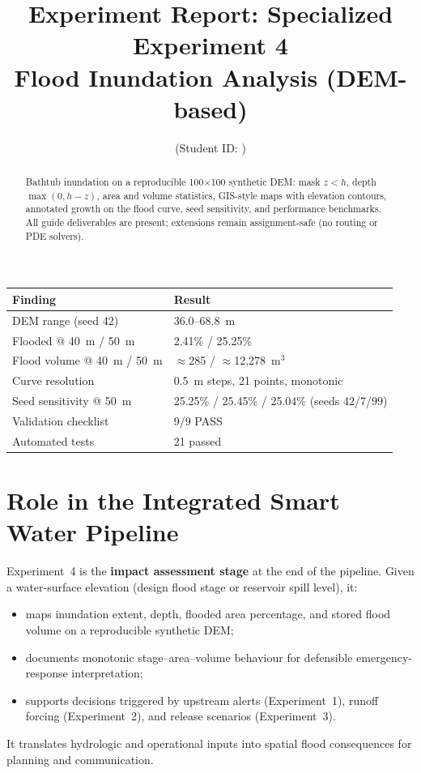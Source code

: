 \documentclass[11pt,a4paper]{article}
\title{Experiment Report: Specialized Experiment 4\\Flood Inundation Analysis (DEM-based)}
\author{\studentname \quad (Student ID: \studentid)}
\date{\reportdate}
\begin{document}
\maketitle

\begin{abstract}
Bathtub inundation on a reproducible 100$\times$100 synthetic DEM: mask $z<h$, depth $\max(0,h-z)$, area and volume statistics, GIS-style maps with elevation contours, annotated growth on the flood curve, seed sensitivity, and performance benchmarks. All guide deliverables are present; extensions remain assignment-safe (no routing or PDE solvers).
\end{abstract}

\begin{tcolorbox}[
  colback=blue!4,
  colframe=blue!55!black,
  title=\textbf{Key Findings (Executive Summary)},
  fonttitle=\bfseries,
  arc=2mm,
]
\begin{tabular}{@{}ll@{}}
\textbf{Finding} & \textbf{Result} \\
\hline
DEM range (seed 42) & 36.0--68.8~m \\
Flooded @ 40~m / 50~m & 2.41\% / 25.25\% \\
Flood volume @ 40~m / 50~m & $\approx$285 / $\approx$12{,}278~m$^3$ \\
Curve resolution & 0.5~m steps, 21 points, monotonic \\
Seed sensitivity @ 50~m & 25.25\% / 25.45\% / 25.04\% (seeds 42/7/99) \\
Validation checklist & 9/9 PASS \\
Automated tests & 21 passed \\
\end{tabular}
\end{tcolorbox}

\section{Role in the Integrated Smart Water Pipeline}
Experiment~4 is the \textbf{impact assessment stage} at the end of the pipeline. Given a water-surface elevation (design flood stage or reservoir spill level), it:
\begin{itemize}[noitemsep]
  \item maps inundation extent, depth, flooded area percentage, and stored flood volume on a reproducible synthetic DEM;
  \item documents monotonic stage--area--volume behaviour for defensible emergency-response interpretation;
  \item supports decisions triggered by upstream alerts (Experiment~1), runoff forcing (Experiment~2), and release scenarios (Experiment~3).
\end{itemize}
It translates hydrologic and operational inputs into spatial flood consequences for planning and communication.
\end{document}
